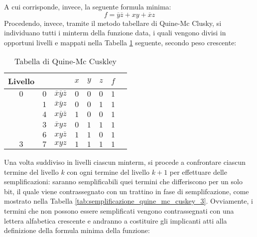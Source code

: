 \documentclass[a4paper]{extarticle}
\renewcommand\arraystretch{}
\begin{document}
\noindent
A cui corrisponde, invece, la seguente formula minima:
\[f = \overline{y}\overline{z} + xy + \overline{x}z\]
Procedendo, invece, tramite il metodo tabellare di Quine-Mc Clusky, si individuano tutti i minterm della funzione data, i quali vengono divisi in opportuni livelli e mappati nella Tabella \ref{tab:tabella_quine_mc_cluskey} seguente, secondo peso crescente:

\begin{table}[H]
    \centering
    \setlength{\tabcolsep}{5pt}
    \renewcommand{\arraystretch}{1.2}
    \begin{tabular}{c|c|c|ccc|cc}
         \textbf{Livello} & & & $x$ & $y$ & $z$ & $f$\\
         \hline
         $0$ & $0$ & $\overline{x}\overline{y}\overline{z}$ & $0$ & $0$ & $0$ & $1$\\
         \hline
         \parbox{3em}{} & $1$ & $\overline{x}\overline{y}z$ & $0$ & $0$ & $1$ & $1$\\
          & $4$ & $x\overline{y}\overline{z}$ & $1$ & $0$ & $0$ & $1$\\
         \hline
         \parbox{3em}{} &
         $3$ & $\overline{x}yz$ & $0$ & $1$ & $1$ & $1$\\
         & $6$ & $xy\overline{z}$ & $1$ & $1$ & $0$ & $1$\\
         \hline
         $3$ & $7$ & $xyz$ & $1$ & $1$ & $1$ & $1$\\
    \end{tabular}
    \caption{Tabella di Quine-Mc Cuskley}
    \label{tab:tabella_quine_mc_cluskey}
\end{table}

\noindent
Una volta suddiviso in livelli ciascun minterm, si procede a confrontare ciascun termine del livello $k$ con ogni termine del livello $k + 1$ per effettuare delle semplificazioni: saranno semplificabili quei termini che differiscono per un solo bit, il quale viene contrassegnato con un trattino in fase di semplifcazione, come mostrato nella Tabella \ref{tab:semplificazione_quine_mc_cuskey_3}. Ovviamente, i termini che non possono essere semplificati vengono contrassegnati con una lettera alfabetica crescente e andranno a costituire gli implicanti atti alla definizione della formula minima della funzione:
\end{document}
